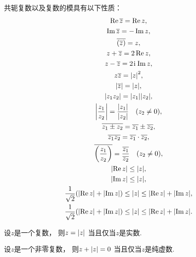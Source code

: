 \begin{property}
共轭复数以及复数的模具有以下性质：\begin{gather}
	\Re \overline{z} = \Re z, \\
	\Im \overline{z} = -\Im z, \\
	\overline{(\overline{z})} = z, \\
	z+\overline{z} = 2 \Re z, \\
	z-\overline{z} = 2\kern1pt\mathrm{i}\kern1pt \Im z, \\
	z\overline{z} = \abs{z}^2, \\
	\abs{\overline{z}}=\abs{z}, \\
	\abs{z_1 z_2} = \abs{z_1} \abs{z_2}, \\
	\abs{\frac{z_1}{z_2}} = \frac{\abs{z_1}}{\abs{z_2}} \quad(z_2 \neq 0), \\
	\overline{z_1 \pm z_2} = \overline{z_1} \pm \overline{z_2}, \\
	\overline{z_1 z_2} = \overline{z_1} \cdot \overline{z_2}, \\
	\overline{\left(\frac{z_1}{z_2}\right)} = \frac{\overline{z_1}}{\overline{z_2}} \quad (z_2 \neq 0), \\
	\abs{\Re z} \leq \abs{z}, \\
	\abs{\Im z} \leq \abs{z}, \\
	\frac1{\sqrt2} (\abs{\Re z} + \abs{\Im z})
	\leq \abs{z}
	\leq \abs{\Re z} + \abs{\Im z}, \\
	\frac1{\sqrt2} (\abs{\Re z} + \abs{\Im z})
	\leq \abs{z}
	\leq \abs{\Re z} + \abs{\Im z}.
\end{gather}
\end{property}

\begin{property}
设\(z\)是一个复数，
则\(z = \abs{z}\)
当且仅当\(z\)是实数.
\end{property}

\begin{property}
设\(z\)是一个非零复数，
则\(z + \abs{z} = 0\)
当且仅当\(z\)是纯虚数.
\end{property}

